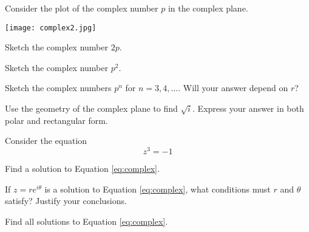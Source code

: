 \documentclass{workbook}
\begin{document}
\begin{slide}
	\question
	Consider the plot of the complex number $p$ in the complex plane.

	\texttt{[image: complex2.jpg]}

	\begin{parts}
		\item Sketch the complex number $2p$.
		\item Sketch the complex number $p^2$.
		\item Sketch the complex numbers $p^n$ for $n=3,4,\ldots$. Will your answer 
		depend on $r$?

		\bigskip 
		\item Use the geometry of the complex plane to find $\sqrt{i}$. Express
		your answer in both polar and rectangular form.
	\end{parts}
\end{slide}

\begin{slide}
	\question
	Consider the equation 
	\begin{equation}
		\label{eq:complex}
		z^3=-1
	\end{equation}

	\begin{parts}
		\item Find a solution to Equation \eqref{eq:complex}.
		\item If $z=re^{i\theta}$ is a solution to Equation \eqref{eq:complex}, 
		what conditions must $r$ and $\theta$ satisfy? Justify your conclusions.
		\item Find all solutions to Equation \eqref{eq:complex}.

	\end{parts}
\end{slide}

%
%
%
\end{document}
